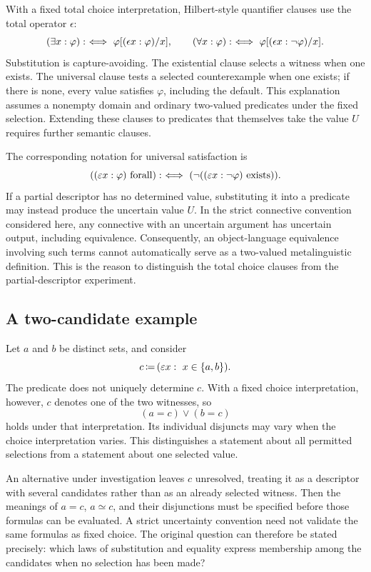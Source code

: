 With a fixed total choice interpretation, Hilbert-style quantifier clauses
use the total operator $\epsilon$:
\[
(\exists x:\varphi) :\ \Longleftrightarrow\  \varphi[(\epsilon x:\varphi)/x],
\qquad
(\forall x:\varphi) :\ \Longleftrightarrow\  \varphi[(\epsilon x:\neg\varphi)/x].
\]
Substitution is capture-avoiding. The existential clause selects a witness
when one exists. The universal clause tests a selected counterexample when
one exists; if there is none, every value satisfies $\varphi$, including the
default. This explanation assumes a nonempty domain and ordinary two-valued
predicates under the fixed selection. Extending these clauses to predicates
that themselves take the value $U$ requires further semantic clauses.

The corresponding notation for universal satisfaction is
\[
((\varepsilon x:\varphi) \mathrm{\ forall})
:\ \Longleftrightarrow\  (\neg((\varepsilon x:\neg\varphi) \mathrm{\ exists})).
\]
If a partial descriptor has no determined value, substituting it into a
predicate may instead produce the uncertain value $U$. In the strict
connective convention considered here, any connective with an uncertain
argument has uncertain output, including equivalence. Consequently, an
object-language equivalence involving such terms cannot automatically serve
as a two-valued metalinguistic definition. This is the reason to distinguish
the total choice clauses from the partial-descriptor experiment.

\subsection{A two-candidate example}
Let $a$ and $b$ be distinct sets, and consider
\[
c\,{\coloneqq}\, (\varepsilon x:\ x\in\{a,b\}).
\]
The predicate does not uniquely determine $c$. With a fixed choice
interpretation, however, $c$ denotes one of the two witnesses, so
\[
(a=c)\lor(b=c)
\]
holds under that interpretation. Its individual disjuncts may vary when the
choice interpretation varies. This distinguishes a statement about all
permitted selections from a statement about one selected value.

An alternative under investigation leaves $c$ unresolved, treating it as a
descriptor with several candidates rather than as an already selected
witness. Then the meanings of $a=c$, $a\simeq c$, and their disjunctions
must be specified before those formulas can be evaluated. A strict
uncertainty convention need not validate the same formulas as fixed choice.
The original question can therefore be stated precisely: which laws of
substitution and equality express membership among the candidates when no
selection has been made?


